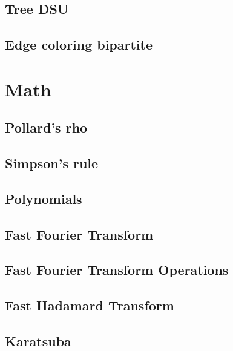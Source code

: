 \begin{multicols}{2}
\subsection{Tree DSU}

\subsection{Edge coloring bipartite}

\section{Math}


\subsection{Pollard's rho}

\subsection{Simpson's rule}

\subsection{Polynomials}

\subsection{Fast Fourier Transform}

\subsection{Fast Fourier Transform Operations}

\subsection{Fast Hadamard Transform}

\subsection{Karatsuba}


\end{multicols}
